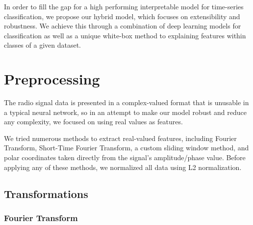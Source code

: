 \documentclass{turabian-thesis}
\begin{document}
In order to fill the gap for a high performing interpretable model for time-series classification, we propose our hybrid model, which focuses on extensibility and robustness. We achieve this through a combination of deep learning models for classification as well as a unique white-box method to explaining features within classes of a given dataset.


\chapter{Preprocessing}
\label{chap:preprocessing}

The radio signal data is presented in a complex-valued format that is unusable in a typical neural network, so in an attempt to make our model robust and reduce any complexity, we focused on using real values as features.

We tried numerous methods to extract real-valued features, including Fourier Transform, Short-Time Fourier Transform, a custom sliding window method, and polar coordinates taken directly from the signal's amplitude/phase value. Before applying any of these methods, we normalized all data using L2 normalization.




\section{Transformations}


\subsection{Fourier Transform}
\end{document}

